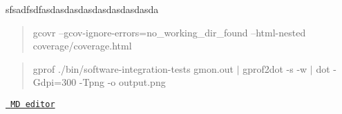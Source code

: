 sfsadfsdfasdasdasdasdasdasdasdasda

\begin{quote}
gcovr --gcov-\/ignore-\/errors=no\+\_\+working\+\_\+dir\+\_\+found --html-\/nested coverage/coverage.\+html \end{quote}


\begin{quote}
gprof ./bin/software-\/integration-\/tests gmon.\+out $\vert$ gprof2dot -\/s -\/w $\vert$ dot -\/Gdpi=300 -\/Tpng -\/o output.\+png \end{quote}


\href{https://pandao.github.io/editor.md/en.html}{\texttt{ MD editor}} 